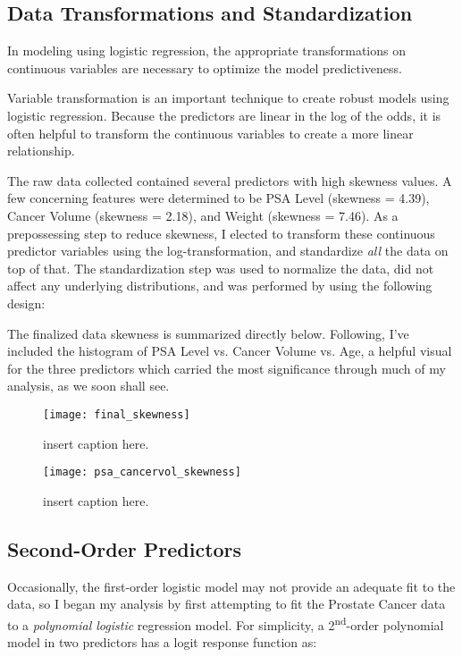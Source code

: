\subsection{Data Transformations and Standardization}
In modeling using logistic regression, the appropriate transformations on continuous variables are necessary to optimize the model predictiveness. \par
Variable transformation is an important technique to create robust models using logistic regression. Because the predictors are linear in the log of the odds, it is often helpful to transform the continuous variables to create a more linear relationship. \par
The raw data collected contained several predictors with high skewness values.
A few concerning features were determined to be PSA Level (skewness = 4.39), Cancer Volume (skewness = 2.18), and Weight (skewness = 7.46). As a prepossessing step to reduce skewness, I elected to transform these continuous predictor variables using the log-transformation, and standardize \textit{all} the data on top of that. The standardization step was used to normalize the data, did not affect any underlying distributions, and was performed by using the following design: \par 
The finalized data skewness is summarized directly below. Following, I've included the histogram of PSA Level vs. Cancer Volume vs. Age, a helpful visual for the three predictors which carried the most significance through much of my analysis, as we soon shall see.


\begin{figure}[H]
	\centering
	\texttt{[image: final\_skewness]}
	\caption{insert caption here.}
\end{figure}


\begin{figure}[H]
	\centering
	\texttt{[image: psa\_cancervol\_skewness]}
	\caption{insert caption here.}
\end{figure}

\subsection{Second-Order Predictors}
Occasionally, the first-order logistic model may not provide an adequate fit to the data, so I began my analysis by first attempting to fit the Prostate Cancer data to a \textit{polynomial logistic} regression model. For simplicity, a 2\textsuperscript{nd}-order polynomial model in two predictors has a logit response function as:

